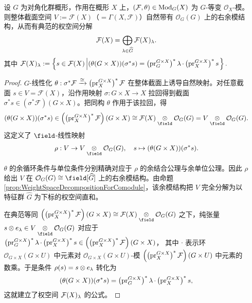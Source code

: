 \begin{lemma}[整体截面的权空间分解]
\label{lem:GlobalSectionDecomposition}
设 $G$ 为对角化群概形，作用在概形 $X$ 上，$(\mathcal{F}, \theta) \in \operatorname{\mathrm{Mod}}_G(X)$ 为 $G$-等变 $\mathcal{O}_X$-模。则整体截面空间 $V := \mathcal{F}(X)$（$=\Gamma(X, \mathcal{F})$）自然带有 $\mathcal{O}_G(G)$ 上的右余模结构，从而有典范的权空间分解
$$
\mathcal{F}(X) = \bigoplus_{\operatorname{\lambda} \in \widehat{G}}
\mathcal{F}(X)_{\operatorname{\lambda}}.
$$
其中
$
\mathcal{F}(X)_{\operatorname{\lambda}}
:=
\left\{
s \in \mathcal{F}(X)
\left|
(\theta(G\times X))(\sigma^* s)
=
\left(\operatorname{\operatorname{pr}}_G^{G \times X}\right)^*\operatorname{\lambda}
\cdot
\left(\operatorname{\operatorname{pr}}_X^{G \times X}\right)^* s
\right.\right\}.
$
\end{lemma}

\begin{proof}
$G$-线性化 $\theta : \sigma^* \mathcal{F} \xrightarrow{\cong} \left(\operatorname{\operatorname{pr}}_X^{G \times X}\right)^* \mathcal{F}$ 在整体截面上诱导自然映射。对任意截面 $s \in V = \mathcal{F}(X)$，沿作用映射 $\sigma:G\times X \rightarrow X$ 拉回得到截面 $\sigma^* s \in (\sigma^*\mathcal{F})(G\times X)$。把同构 $\theta$ 作用于该拉回，得
$$
(\theta(G\times X))(\sigma^* s)
\in
\left(\left(\pr_X^{G \times X}\right)^* \mathcal{F}\right)(G\times X)
\cong
\mathcal{F}(X) \underset{\field}{\otimes} \mathcal{O}_G(G)
=
V \underset{\field}{\otimes} \mathcal{O}_G(G).
$$
这定义了 $\field$-线性映射
$$
\rho
:
V \rightarrow V \underset{\field}{\otimes} \mathcal{O}_G(G),
\quad
s
\mapsto
(\theta(G\times X))(\sigma^* s).
$$

$\theta$ 的余循环条件与单位条件分别精确对应于 $\rho$ 的余结合公理与余单位公理。因此 $\rho$ 给出 $V$ 在 $\mathcal{O}_G(G) \cong \field[\widehat{G}]$ 上的右余模结构。由命题 \ref{prop:WeightSpaceDecompositionForComodule}，该余模结构把 $V$ 完全分解为以特征群 $\widehat{G}$ 为下标的权空间直和。

在典范等同
$
\left(\left(\pr_X^{G \times X}\right)^* \mathcal{F}\right)(G\times X)
\cong
\mathcal{F}(X) \underset{\field}{\otimes} \mathcal{O}_G(G)
$
之下，纯张量 $s \otimes e_{\cha} \in V \underset{\field}{\otimes} \mathcal{O}_G(G)$ 对应于
$
\left(\operatorname{\operatorname{pr}}_G^{G \times X}\right)^*\operatorname{\lambda}
\cdot
\left(\operatorname{\operatorname{pr}}_X^{G \times X}\right)^* s
\in
\left(\left(\operatorname{\operatorname{pr}}_X^{G \times X}\right)^* \mathcal{F}\right)(G\times X)
$，
其中 $\cdot$ 表示环 $\mathcal{O}_{G\times X}(G\times U)$ 中元素对 $\mathcal{O}_{G\times X}(G\times U)$-模
$\left(\left(\operatorname{\operatorname{pr}}_X^{G \times X}\right)^*\mathcal{F}\right)(G\times U)$ 中元素的数乘。于是条件 $\rho(s) = s \otimes e_{\operatorname{\lambda}}$ 转化为
$$
(\theta(G\times X))(\sigma^* s) = \left(\operatorname{\operatorname{pr}}_G^{G \times X}\right)^*\operatorname{\lambda} \cdot \left(\operatorname{\operatorname{pr}}_X^{G \times X}\right)^* s,
$$
这就建立了权空间 $\mathcal{F}(X)_{\operatorname{\lambda}}$ 的公式。
\end{proof}


